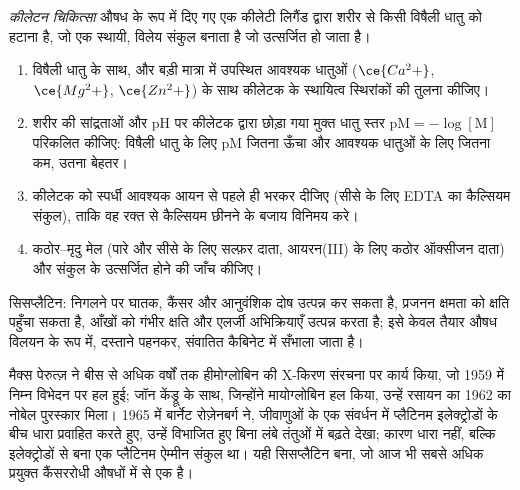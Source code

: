 \begin{definition}[कीलेटन चिकित्सा]\label{def:b3:bioinorganic:chelation-therapy}
\emph{कीलेटन चिकित्सा} औषध के रूप में दिए गए एक कीलेटी लिगैंड द्वारा
शरीर से किसी विषैली धातु को हटाना है, जो एक स्थायी,
विलेय संकुल बनाता है जो उत्सर्जित हो जाता है।
\end{definition}

\begin{method}\label{met:b3:bioinorganic:choose-chelator}
\begin{enumerate}
  \item विषैली धातु के साथ, और बड़ी मात्रा में उपस्थित आवश्यक धातुओं ($\ce{Ca^2+}$, $\ce{Mg^2+}$,
        $\ce{Zn^2+}$) के साथ कीलेटक के स्थायित्व स्थिरांकों की तुलना कीजिए।
  \item शरीर की सांद्रताओं और pH पर कीलेटक द्वारा छोड़ा गया मुक्त धातु स्तर $\mathrm{pM} = -\log[\mathrm M]$
        परिकलित कीजिए: विषैली धातु के लिए pM जितना ऊँचा और
        आवश्यक धातुओं के लिए जितना कम, उतना बेहतर।
  \item कीलेटक को स्पर्धी आवश्यक आयन से पहले ही भरकर दीजिए (सीसे के लिए EDTA का
        कैल्सियम संकुल), ताकि वह रक्त से कैल्सियम छीनने के बजाय
        विनिमय करे।
  \item कठोर--मृदु मेल (पारे और सीसे के लिए सल्फ़र दाता, आयरन(III) के लिए कठोर
        ऑक्सीजन दाता) और संकुल के उत्सर्जित होने की जाँच कीजिए।
\end{enumerate}
\end{method}

\begin{safety}{}
सिसप्लैटिन: निगलने पर घातक, कैंसर और आनुवंशिक दोष उत्पन्न कर सकता है, प्रजनन क्षमता को
क्षति पहुँचा सकता है, आँखों को गंभीर क्षति और एलर्जी अभिक्रियाएँ उत्पन्न करता है; इसे
केवल तैयार औषध विलयन के रूप में, दस्ताने पहनकर, संवातित कैबिनेट में सँभाला जाता है।
\end{safety}

\begin{history}
मैक्स पेरुत्ज़ ने बीस से अधिक वर्षों तक हीमोग्लोबिन की X-किरण संरचना पर कार्य किया,
जो 1959 में निम्न विभेदन पर हल हुई; जॉन केंड्रू के साथ, जिन्होंने
मायोग्लोबिन हल किया, उन्हें रसायन का 1962 का नोबेल पुरस्कार मिला। 1965 में बार्नेट
रोज़ेनबर्ग ने, जीवाणुओं के एक संवर्धन में प्लैटिनम इलेक्ट्रोडों के बीच धारा प्रवाहित करते हुए,
उन्हें विभाजित हुए बिना लंबे तंतुओं में बढ़ते देखा; कारण
धारा नहीं, बल्कि इलेक्ट्रोडों से बना एक प्लैटिनम ऐम्मीन संकुल था। यही
सिसप्लैटिन बना, जो आज भी सबसे अधिक प्रयुक्त कैंसररोधी औषधों में से एक है।
\end{history}


